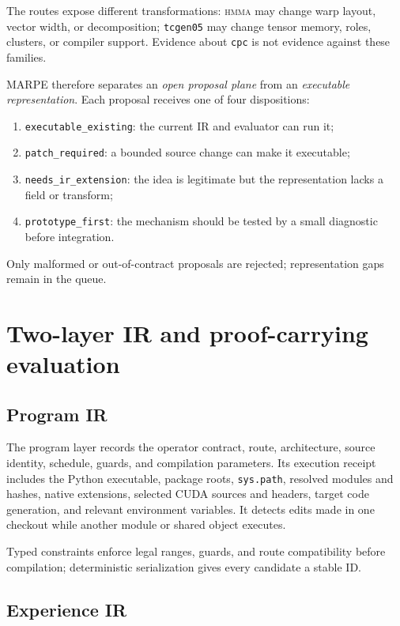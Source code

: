 \documentclass[11pt]{article}
\newcommand{\hmma}{\textsc{hmma}}
\newcommand{\tcgen}{\texttt{tcgen05}}
\newcommand{\cpc}{\texttt{cpc}}
\begin{document}
The routes expose different transformations: \hmma{} may change warp layout, vector width, or decomposition; \tcgen{} may change tensor memory, roles, clusters, or compiler support. Evidence about \cpc{} is not evidence against these families.

MARPE therefore separates an \emph{open proposal plane} from an \emph{executable representation}. Each proposal receives one of four dispositions:
\begin{enumerate}
  \item \texttt{executable\_existing}: the current IR and evaluator can run it;
  \item \texttt{patch\_required}: a bounded source change can make it executable;
  \item \texttt{needs\_ir\_extension}: the idea is legitimate but the representation lacks a field or transform;
  \item \texttt{prototype\_first}: the mechanism should be tested by a small diagnostic before integration.
\end{enumerate}
Only malformed or out-of-contract proposals are rejected; representation gaps remain in the queue.

\section{Two-layer IR and proof-carrying evaluation}

\subsection{Program IR}

The program layer records the operator contract, route, architecture, source identity, schedule, guards, and compilation parameters. Its execution receipt includes the Python executable, package roots, \texttt{sys.path}, resolved modules and hashes, native extensions, selected CUDA sources and headers, target code generation, and relevant environment variables. It detects edits made in one checkout while another module or shared object executes.

Typed constraints enforce legal ranges, guards, and route compatibility before compilation; deterministic serialization gives every candidate a stable ID.

\subsection{Experience IR}
\end{document}
